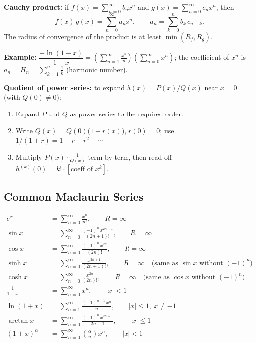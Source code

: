 \documentclass[12pt, a4paper]{article}
\theoremstyle{definition}
\theoremstyle{remark}
\begin{document}
\textbf{Cauchy product:} if $f(x) = \displaystyle\sum_{n=0}^\infty b_n x^n$ and
$g(x) = \displaystyle\sum_{n=0}^\infty c_n x^n$, then
\[
  f(x)\,g(x) = \sum_{n=0}^\infty a_n x^n, \qquad a_n = \sum_{k=0}^n b_k\,c_{n-k}.
\]
The radius of convergence of the product is at least $\min(R_f, R_g)$.

\textbf{Example:} $\dfrac{-\ln(1-x)}{1-x}
  = \!\left(\sum_{n=1}^\infty \tfrac{x^n}{n}\right)\!\!\left(\sum_{n=0}^\infty x^n\right)$;
the coefficient of $x^n$ is $a_n = H_n = \sum_{k=1}^n \tfrac{1}{k}$ (harmonic number).

\textbf{Quotient of power series:} to expand $h(x) = P(x)/Q(x)$ near $x=0$ (with $Q(0)\ne 0$):
\begin{enumerate}
  \item Expand $P$ and $Q$ as power series to the required order.
  \item Write $Q(x) = Q(0)\bigl(1+r(x)\bigr)$, $r(0)=0$; use $1/(1+r) = 1-r+r^2-\cdots$
  \item Multiply $P(x)\cdot\tfrac{1}{Q(x)}$ term by term, then read off $h^{(k)}(0) = k!\cdot[\text{coeff of }x^k]$.
\end{enumerate}

\subsection{Common Maclaurin Series}
\begin{align*}
  e^x &= \sum_{n=0}^\infty \frac{x^n}{n!}, \qquad R = \infty \\[4pt]
  \sin x &= \sum_{n=0}^\infty \frac{(-1)^n\, x^{2n+1}}{(2n+1)!}, \qquad R = \infty \\[4pt]
  \cos x &= \sum_{n=0}^\infty \frac{(-1)^n\, x^{2n}}{(2n)!}, \qquad R = \infty \\[4pt]
  \sinh x &= \sum_{n=0}^\infty \frac{x^{2n+1}}{(2n+1)!}, \qquad R = \infty
  \quad \text{(same as }\sin x\text{ without }(-1)^n\text{)} \\[4pt]
  \cosh x &= \sum_{n=0}^\infty \frac{x^{2n}}{(2n)!}, \qquad R = \infty
  \quad \text{(same as }\cos x\text{ without }(-1)^n\text{)} \\[4pt]
  \frac{1}{1-x} &= \sum_{n=0}^\infty x^n, \qquad |x| < 1 \\[4pt]
  \ln(1+x) &= \sum_{n=1}^\infty \frac{(-1)^{n+1}\, x^n}{n}, \qquad |x| \le 1,\ x \ne -1 \\[4pt]
  \arctan x &= \sum_{n=0}^\infty \frac{(-1)^n\, x^{2n+1}}{2n+1}, \qquad |x| \le 1 \\[4pt]
  (1+x)^\alpha &= \sum_{n=0}^\infty \binom{\alpha}{n} x^n, \qquad |x| < 1
\end{align*}
\end{document}

